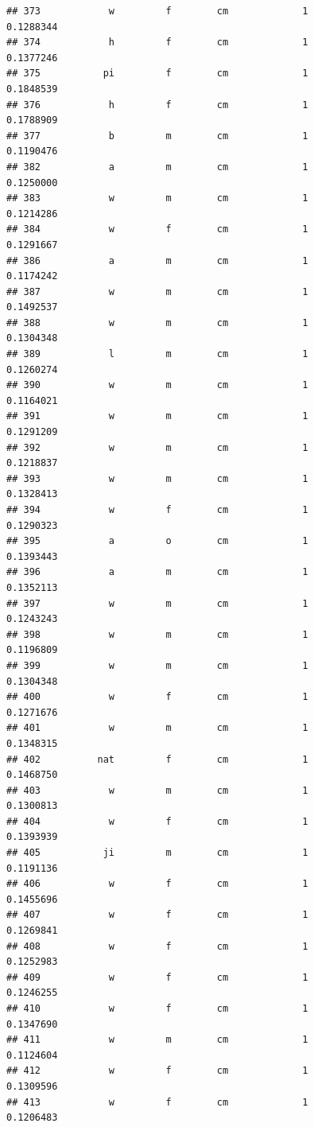 \documentclass[]{article}
\begin{document}
\begin{verbatim}
## 373            w         f        cm             1          0.1288344
## 374            h         f        cm             1          0.1377246
## 375           pi         f        cm             1          0.1848539
## 376            h         f        cm             1          0.1788909
## 377            b         m        cm             1          0.1190476
## 382            a         m        cm             1          0.1250000
## 383            w         m        cm             1          0.1214286
## 384            w         f        cm             1          0.1291667
## 386            a         m        cm             1          0.1174242
## 387            w         m        cm             1          0.1492537
## 388            w         m        cm             1          0.1304348
## 389            l         m        cm             1          0.1260274
## 390            w         m        cm             1          0.1164021
## 391            w         m        cm             1          0.1291209
## 392            w         m        cm             1          0.1218837
## 393            w         m        cm             1          0.1328413
## 394            w         f        cm             1          0.1290323
## 395            a         o        cm             1          0.1393443
## 396            a         m        cm             1          0.1352113
## 397            w         m        cm             1          0.1243243
## 398            w         m        cm             1          0.1196809
## 399            w         m        cm             1          0.1304348
## 400            w         f        cm             1          0.1271676
## 401            w         m        cm             1          0.1348315
## 402          nat         f        cm             1          0.1468750
## 403            w         m        cm             1          0.1300813
## 404            w         f        cm             1          0.1393939
## 405           ji         m        cm             1          0.1191136
## 406            w         f        cm             1          0.1455696
## 407            w         f        cm             1          0.1269841
## 408            w         f        cm             1          0.1252983
## 409            w         f        cm             1          0.1246255
## 410            w         f        cm             1          0.1347690
## 411            w         m        cm             1          0.1124604
## 412            w         f        cm             1          0.1309596
## 413            w         f        cm             1          0.1206483

\end{verbatim}
\end{document}
